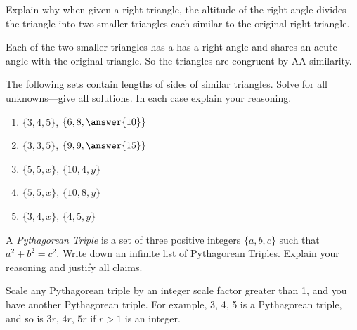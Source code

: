 \documentclass[nooutcomes]{ximera}
\begin{document}
\begin{question}
Explain why when given a right triangle, the altitude of the
  right angle divides the triangle into two smaller triangles each
  similar to the original right triangle.
\begin{freeResponse}
\begin{hint}
Each of the two smaller triangles has a has a right angle and shares an acute angle with the original triangle.  So the triangles are congruent by AA similarity.  
\end{hint}
\end{freeResponse}
\end{question}

\begin{question}
The following sets contain lengths of sides of similar
  triangles. Solve for all unknowns---give all solutions. In each case
  explain your reasoning.
\begin{enumerate}
\item $\{3,4,5\}$, $\{6,8,\answer{10}\}$
\item $\{3,3,5\}$, $\{9,9,\answer{15}\}$
\item $\{5,5,x\}$, $\{10,4,y\}$
\item $\{5,5,x\}$, $\{10,8,y\}$
\item $\{3,4,x\}$, $\{4,5,y\}$ 
\end{enumerate}
\begin{freeResponse}
\begin{hint}
\end{hint}
\end{freeResponse}
\end{question}

\begin{question}
A \textit{Pythagorean Triple} is a set
  of three positive integers $\{a,b,c\}$ such that $a^2 + b^2 =
  c^2$. Write down an infinite list of Pythagorean Triples. Explain
  your reasoning and justify all claims.
\begin{freeResponse}
\begin{hint}
Scale any Pythagorean triple by an integer scale factor greater than 1, and you have another Pythagorean triple.  For example, 3, 4, 5 is a Pythagorean triple, and so is $3r$, $4r$, $5r$ if $r > 1$ is an integer.  
\end{hint}
\end{freeResponse}
\end{question}
\end{document}
